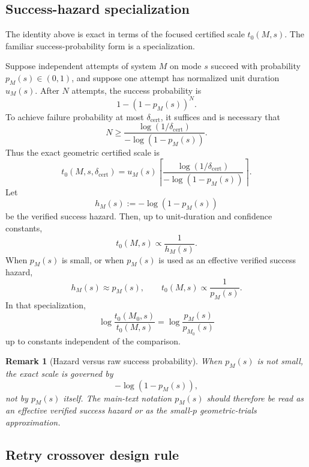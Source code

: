 \documentclass{article}
\newtheorem{remark}{Remark}
\begin{document}
\subsection{Success-hazard specialization}

The identity above is exact in terms of the focused certified scale \(t_0(M,s)\).
The familiar success-probability form is a specialization.

Suppose independent attempts of system \(M\) on mode \(s\) succeed with probability
\(p_M(s)\in(0,1)\), and suppose one attempt has normalized unit duration \(u_M(s)\).
After \(N\) attempts, the success probability is
\[
    1-(1-p_M(s))^N.
\]
To achieve failure probability at most \(\delta_{\mathrm{cert}}\), it suffices and is necessary that
\[
    N
    \ge
    \frac{\log(1/\delta_{\mathrm{cert}})}
         {-\log(1-p_M(s))}.
\]
Thus the exact geometric certified scale is
\[
    t_0(M,s,\delta_{\mathrm{cert}})
    =
    u_M(s)
    \left\lceil
    \frac{\log(1/\delta_{\mathrm{cert}})}
         {-\log(1-p_M(s))}
    \right\rceil.
\]
Let
\[
    h_M(s):=-\log(1-p_M(s))
\]
be the verified success hazard.  Then, up to unit-duration and confidence constants,
\[
    t_0(M,s)\propto \frac{1}{h_M(s)}.
\]
When \(p_M(s)\) is small, or when \(p_M(s)\) is used as an effective verified success
hazard,
\[
    h_M(s)\approx p_M(s),
    \qquad
    t_0(M,s)\propto\frac{1}{p_M(s)}.
\]
In that specialization,
\[
    \log\frac{t_0(M_0,s)}{t_0(M,s)}
    =
    \log\frac{p_M(s)}{p_{M_0}(s)}
\]
up to constants independent of the comparison.

\begin{remark}[Hazard versus raw success probability]
When \(p_M(s)\) is not small, the exact scale is governed by
\[
    -\log(1-p_M(s)),
\]
not by \(p_M(s)\) itself.  The main-text notation \(p_M(s)\) should therefore be read
as an effective verified success hazard or as the small-\(p\) geometric-trials approximation.
\end{remark}

\subsection{Retry crossover design rule}
\label{app:retry-crossover}
\end{document}
